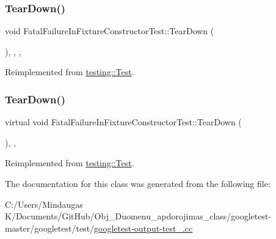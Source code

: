 \mbox{\label{class_fatal_failure_in_fixture_constructor_test_a533465f7e241d56cb21ec11aa94f1908}} 
\subsubsection{\texorpdfstring{TearDown()}{TearDown()}\hspace{0.1cm}{\footnotesize\ttfamily [2/3]}}
{\footnotesize\ttfamily void Fatal\+Failure\+In\+Fixture\+Constructor\+Test\+::\+Tear\+Down (\begin{DoxyParamCaption}{ }\end{DoxyParamCaption})\hspace{0.3cm}{\ttfamily [inline]}, {\ttfamily [override]}, {\ttfamily [protected]}, {\ttfamily [virtual]}}



Reimplemented from \mbox{\hyperlink{classtesting_1_1_test_a5f0ab439802cbe0ef7552f1a9f791923}{testing\+::\+Test}}.

\mbox{\label{class_fatal_failure_in_fixture_constructor_test_a2763026a557e1fce4e59bd16c4eced57}} 
\subsubsection{\texorpdfstring{TearDown()}{TearDown()}\hspace{0.1cm}{\footnotesize\ttfamily [3/3]}}
{\footnotesize\ttfamily virtual void Fatal\+Failure\+In\+Fixture\+Constructor\+Test\+::\+Tear\+Down (\begin{DoxyParamCaption}{ }\end{DoxyParamCaption})\hspace{0.3cm}{\ttfamily [inline]}, {\ttfamily [protected]}, {\ttfamily [virtual]}}



Reimplemented from \mbox{\hyperlink{classtesting_1_1_test_a5f0ab439802cbe0ef7552f1a9f791923}{testing\+::\+Test}}.



The documentation for this class was generated from the following file\+:\begin{DoxyCompactItemize}
\item 
C\+:/\+Users/\+Mindaugas K/\+Documents/\+Git\+Hub/\+Obj\+\_\+\+Duomenu\+\_\+apdorojimas\+\_\+class/googletest-\/master/googletest/test/\mbox{\hyperlink{googletest-master_2googletest_2test_2googletest-output-test___8cc}{googletest-\/output-\/test\+\_\+.\+cc}}\end{DoxyCompactItemize}
